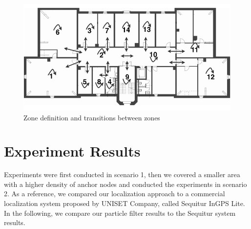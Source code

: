 \begin{figure}[th]
\centering
\includegraphics[width=1.0\textwidth]{Figures/zone_definition}
\decoRule
\caption[Zone Definition]{Zone definition and transitions between zones}
\label{fig:zone_definition}
\end{figure}

\section{Experiment Results}
Experiments were first conducted in scenario 1, then we covered a smaller area with a higher density of anchor nodes and conducted the experiments in scenario 2. As a reference, we compared our localization approach to a commercial localization system proposed by UNISET Company, called Sequitur InGPS Lite. In the following, we compare our particle filter results to the Sequitur system results.
